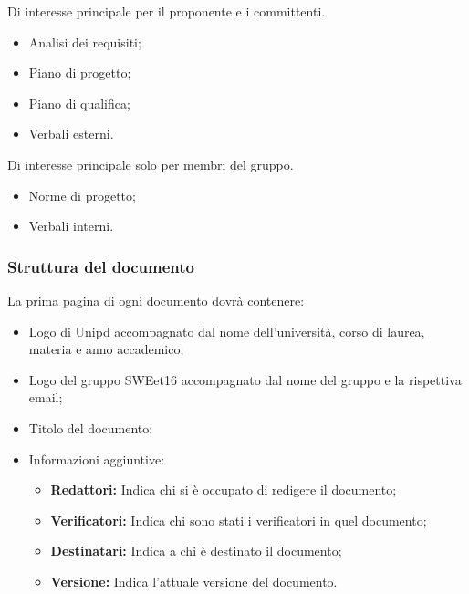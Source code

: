     Di interesse principale per il proponente e i committenti.
    \begin{itemize}
      \item Analisi dei requisiti;
      \item Piano di progetto;
      \item Piano di qualifica;
      \item Verbali esterni.
    \end{itemize}

    Di interesse principale solo per membri del gruppo.
    \begin{itemize}
      \item Norme di progetto;
      \item Verbali interni.
    \end{itemize}


\subsubsection{Struttura del documento}

        La prima pagina di ogni documento dovrà contenere:
        \begin{itemize}
          \item Logo di Unipd accompagnato dal nome dell'università, corso di laurea, materia e anno accademico;
          \item Logo del gruppo SWEet16 accompagnato dal nome del gruppo e la rispettiva email;
          \item Titolo del documento;
          \item Informazioni aggiuntive:
          \begin{itemize}
            \item \textbf{Redattori:} Indica chi si è occupato di redigere il documento;
            \item \textbf{Verificatori:} Indica chi sono stati i verificatori in quel documento;
            \item \textbf{Destinatari:} Indica a chi è destinato il documento;
            \item \textbf{Versione:} Indica l'attuale versione del documento.
          \end{itemize}
        \end{itemize}



